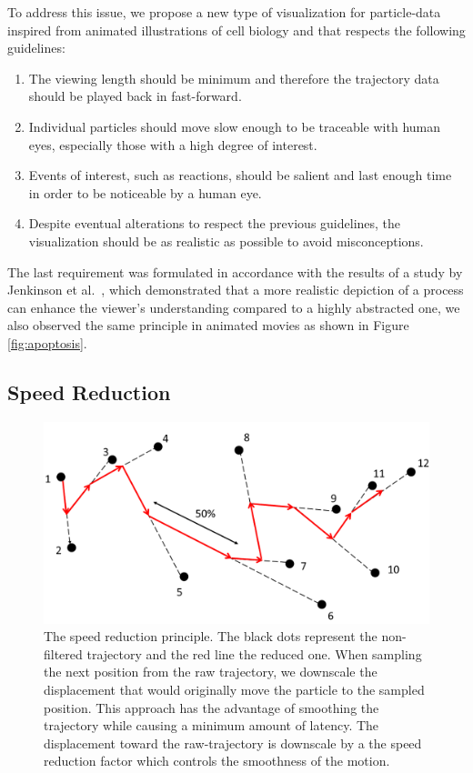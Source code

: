 To address this issue, we propose a new type of visualization for particle-data inspired from animated illustrations of cell biology and that respects the following guidelines:
\begin{enumerate}
	\item The viewing length should be minimum and therefore the trajectory data should be played back in fast-forward.	
	\item Individual particles should move slow enough to be traceable with human eyes, especially those with a high degree of interest.	
	\item Events of interest, such as reactions, should be salient and last enough time in order to be noticeable by a human eye.	
	\item Despite eventual alterations to respect the previous guidelines, the visualization should be as realistic as possible to avoid misconceptions.
\end{enumerate}

The last requirement was formulated in accordance with the results of a study by Jenkinson et al.~\cite{jenkinson2012visualizing}, which demonstrated that a more realistic depiction of a process can enhance the viewer’s understanding compared to a highly abstracted one, we also observed the same principle in animated movies as shown in Figure \ref{fig:apoptosis}.

\subsection{Speed Reduction}

\begin{figure}
	\centering
	\includegraphics[width=0.5\linewidth]{graphics/SpeedReduction}
	\caption{The speed reduction principle. The black dots represent the non-filtered trajectory and the red line the reduced one. When sampling the next position from the raw trajectory, we downscale the displacement that would originally move the particle to the sampled position. This approach has the advantage of smoothing the trajectory while causing a minimum amount of latency. The displacement toward the raw-trajectory is downscale by a the speed reduction factor which controls the smoothness of the motion.}
	\label{fig:speedreduction}
\end{figure}

